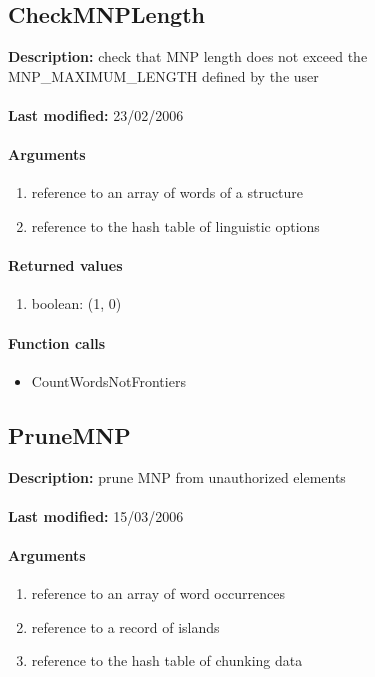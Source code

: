 \subsection{CheckMNPLength}
\textbf{Description:} check that MNP length does not exceed the MNP\_MAXIMUM\_LENGTH defined by the user\\
\\\textbf{Last modified:} 23/02/2006

\paragraph{Arguments}
\begin{enumerate}
\item reference to an array of words of a structure
\item reference to the hash table of linguistic options
\end{enumerate}

\paragraph{Returned values}
\begin{enumerate}
\item boolean: (1, 0)
\end{enumerate}

\paragraph{Function calls}
\begin{itemize}
\item CountWordsNotFrontiers
\end{itemize}

\subsection{PruneMNP}
\textbf{Description:} prune MNP from unauthorized elements\\
\\\textbf{Last modified:} 15/03/2006

\paragraph{Arguments}
\begin{enumerate}
\item reference to an array of word occurrences
\item reference to a record of islands
\item reference to the hash table of chunking data
\end{enumerate}

